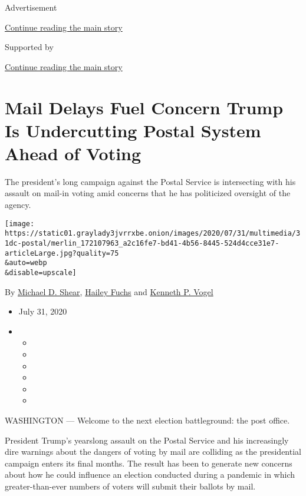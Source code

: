 Advertisement

\protect\hyperlink{after-top}{Continue reading the main story}

Supported by

\protect\hyperlink{after-sponsor}{Continue reading the main story}

\hypertarget{mail-delays-fuel-concern-trump-is-undercutting-postal-system-ahead-of-voting}{%
\section{Mail Delays Fuel Concern Trump Is Undercutting Postal System
Ahead of
Voting}\label{mail-delays-fuel-concern-trump-is-undercutting-postal-system-ahead-of-voting}}

The president's long campaign against the Postal Service is intersecting
with his assault on mail-in voting amid concerns that he has politicized
oversight of the agency.

\texttt{[image: https://static01.graylady3jvrrxbe.onion/images/2020/07/31/multimedia/31dc-postal/merlin\_172107963\_a2c16fe7-bd41-4b56-8445-524d4cce31e7-articleLarge.jpg?quality=75\\\&auto=webp\\\&disable=upscale]}

By \href{https://www.nytimes3xbfgragh.onion/by/michael-d-shear}{Michael
D. Shear},
\href{https://www.nytimes3xbfgragh.onion/by/hailey-fuchs}{Hailey Fuchs}
and \href{https://www.nytimes3xbfgragh.onion/by/kenneth-p-vogel}{Kenneth
P. Vogel}

\begin{itemize}
\item
  July 31, 2020
\item
  \begin{itemize}
  \item
  \item
  \item
  \item
  \item
  \item
  \end{itemize}
\end{itemize}

WASHINGTON --- Welcome to the next election battleground: the post
office.

President Trump's yearslong assault on the Postal Service and his
increasingly dire warnings about the dangers of voting by mail are
colliding as the presidential campaign enters its final months. The
result has been to generate new concerns about how he could influence an
election conducted during a pandemic in which greater-than-ever numbers
of voters will submit their ballots by mail.

